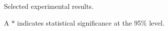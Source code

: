 





\begin{frame}{Selected experimental results.}

%
%

{
\MicrocreditProfitResultsTable{}
}



A $*$ indicates statistical significance at the 95\% level.
\end{frame}
